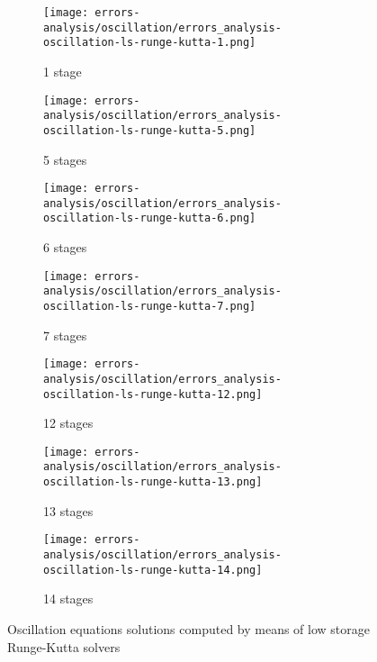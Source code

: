 \documentclass[pdftex,preprint,3p,times,numbers]{elsarticle}
\begin{document}
\begin{figure}[!ht]
  \centering
  \begin{subfigure}[b]{0.45\textwidth}
    \centering
    \texttt{[image: errors-analysis/oscillation/errors\_analysis-oscillation-ls-runge-kutta-1.png]}
    \caption{1 stage}\label{fig:results-oscillation-ls-runge-kutta-1}
  \end{subfigure}\quad%
  \begin{subfigure}[b]{0.45\textwidth}
    \centering
    \texttt{[image: errors-analysis/oscillation/errors\_analysis-oscillation-ls-runge-kutta-5.png]}
    \caption{5 stages}\label{fig:results-oscillation-ls-runge-kutta-5}
  \end{subfigure}
  \begin{subfigure}[b]{0.45\textwidth}
    \centering
    \texttt{[image: errors-analysis/oscillation/errors\_analysis-oscillation-ls-runge-kutta-6.png]}
    \caption{6 stages}\label{fig:results-oscillation-ls-runge-kutta-6}
  \end{subfigure}\quad%
  \begin{subfigure}[b]{0.45\textwidth}
    \centering
    \texttt{[image: errors-analysis/oscillation/errors\_analysis-oscillation-ls-runge-kutta-7.png]}
    \caption{7 stages}\label{fig:results-oscillation-ls-runge-kutta-7}
  \end{subfigure}
  \begin{subfigure}[b]{0.45\textwidth}
    \centering
    \texttt{[image: errors-analysis/oscillation/errors\_analysis-oscillation-ls-runge-kutta-12.png]}
    \caption{12 stages}\label{fig:results-oscillation-ls-runge-kutta-12}
  \end{subfigure}\quad%
  \begin{subfigure}[b]{0.45\textwidth}
    \centering
    \texttt{[image: errors-analysis/oscillation/errors\_analysis-oscillation-ls-runge-kutta-13.png]}
    \caption{13 stages}\label{fig:results-oscillation-ls-runge-kutta-13}
  \end{subfigure}
  \begin{subfigure}[b]{0.45\textwidth}
    \centering
    \texttt{[image: errors-analysis/oscillation/errors\_analysis-oscillation-ls-runge-kutta-14.png]}
    \caption{14 stages}\label{fig:results-oscillation-ls-runge-kutta-14}
  \end{subfigure}\quad%
  \caption{Oscillation equations solutions computed by means of low storage Runge-Kutta solvers}\label{fig:results-oscillation-ls-runge-kutta}
\end{figure}
\end{document}
